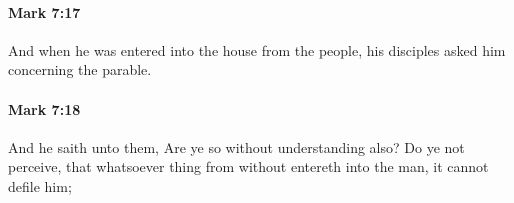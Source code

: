 		\paragraph{Mark 7:17} %
			\label{MARK-7-17}

			And when he was entered into the house from the people, his disciples asked him concerning the parable.

			\begin{framed}
			\scriptsize
				\begin{compactdesc}
					\item[SBLG] 
				\end{compactdesc}
			\end{framed}

		\paragraph{Mark 7:18} %
			\label{MARK-7-18}

			And he saith unto them, Are ye so without understanding also? Do ye not perceive, that whatsoever thing from without entereth into the man, it cannot defile him;


